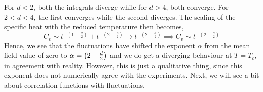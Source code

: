 For $d<2$, both the integrals diverge while for $d>4$, both converge. For $2<d<4$, the first converges while the second diverges. The scaling of the specific heat with the reduced temperature then becomes, 
$$C_v \sim t^{-(1-\frac{d}{2})}+t^{-(2-\frac{d}{2})}\longrightarrow t^{-(2-\frac{d}{2})} \implies \boxed{C_v \sim t^{-(2-\frac{d}{2})} }$$
Hence, we see that the fluctuations have shifted the exponent $\alpha$ from the mean field value of zero to $\alpha =\qty(2-\frac{d}{2})$ and we do get a diverging behaviour at $T=T_c$, in agreement with reality. However, this is just a qualitative thing, since this exponent does not numerically agree with the experiments. Next, we will see a bit about correlation functions with fluctuations.